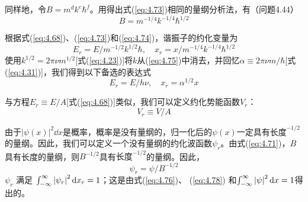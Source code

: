     同样地，令$B = m^dk^e\hbar^f$。用得出式(\ref{eq:4.73})相同的量纲分析法，有（问题4.44）
    \begin{equation}
        B = m^{-1/4}k^{-1/4}\hbar^{1/2}
        \label{eq:4.74}
    \end{equation}

    根据式(\ref{eq:4.68})、(\ref{eq:4.73})和(\ref{eq:4.74})，谐振子的约化变量为
    \begin{equation}
        E_r = E / m^{-1/2}k^{1/2}\hbar, \quad x_r = x / m^{-1/4}k^{-1/4}\hbar^{1/2}
        \label{eq:4.75}
    \end{equation}
    使用$k^{1/2} = 2\pi\nu m^{1/2}$[式(\ref{eq:4.23})]将$k$从(\ref{eq:4.75})中消去，并回忆$\alpha \equiv 2\pi\nu m/\hbar$[式(\ref{eq:4.31})]，我们得到以下备选的表达式
    \begin{equation}
        E_r = E /h\nu, \quad x_r = \alpha ^{1/2}x
        \label{eq:4.76}
    \end{equation}

    与方程$E_r \equiv E/A$[式(\ref{eq:4.68})]类似，我们可以定义约化势能函数$V_r$：
    \begin{equation}
        V_r \equiv V / A
        \label{eq:4.77}
    \end{equation}

    由于$\left|\psi\left(x\right)\right|^2\dd x$是概率，概率是没有量纲的，归一化后的$\psi\left(x\right)$一定具有$\text{长度}^{-1/2}$的量纲。因此，我们可以定义一个没有量纲的约化波函数$\psi_r$。由式(\ref{eq:4.71})，$B$具有长度的量纲，则$B^{-1/2}$具有$\text{长度}^{-1/2}$的量纲。因此，
    \begin{equation}
        \psi_r = \psi / B^{-1/2}
        \label{eq:4.78}
    \end{equation}
    $\psi_r$ 满足 $\int_{-\infty}^{\infty} \left|\psi_r\right|^2\dd x_r = 1$；这是由式(\ref{eq:4.76})、 (\ref{eq:4.78}) 和$\int_{-\infty}^{\infty} \left|\psi\right|^2\dd x = 1$得出的。

